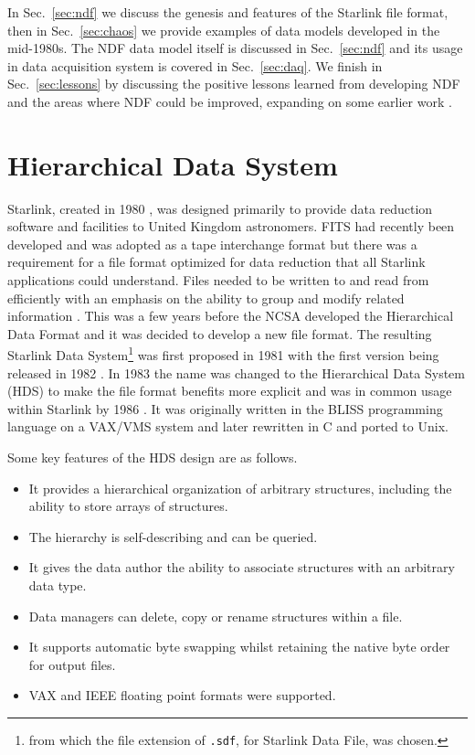 \documentclass[final,authoryear,5p,times,twocolumn]{elsarticle}
\begin{document}
In Sec.\ \ref{sec:ndf} we discuss the genesis and features of the Starlink
file format, then in Sec.\ \ref{sec:chaos} we provide examples of data
models developed in the mid-1980s. The NDF data model itself is
discussed in Sec.\ \ref{sec:ndf} and its usage in data acquisition
system is covered in Sec.\ \ref{sec:daq}. We finish in Sec.\
\ref{sec:lessons} by discussing the positive lessons learned from
developing NDF and the areas where NDF could be improved, expanding on
some earlier work \citep{P91_adassxxiii}.

\section{Hierarchical Data System}
\label{sec:hds}

Starlink, created in 1980
\citep{1980IrAJ...14..197E,1982MmSAI..53...55T}, was designed
primarily to provide data reduction software and facilities to United
Kingdom astronomers. FITS
\citep{1979ipia.coll..445W,1981A&AS...44..363W} had recently been
developed and was adopted as a tape interchange format but there was a
requirement for a file format optimized for data reduction that all
Starlink applications could understand. Files
needed to be written to and read from efficiently with an emphasis on the
ability to group and modify related information
\citep{1981STARENT4}. This was a few years before the NCSA developed
the Hierarchical Data Format \citep{HDF1,Folk2010} and it was decided
to develop a new file format. The resulting Starlink Data
System\footnote{from which the file extension of \texttt{.sdf}, for
  Starlink Data File, was chosen.} was first proposed in 1981 with the
first version being released in 1982 \citep[see
e.g.][]{1982QJRAS..23..485D,1991STARB...8....2L}. In 1983 the name was
changed to the Hierarchical Data System (HDS) to make the file format
benefits more explicit and was in common usage within Starlink by 1986
\citep{1986BICDS..30...13L}. It was originally written in the BLISS
programming language on a VAX/VMS system and later rewritten in C and
ported to Unix.

Some key features of the HDS design are as follows.
\begin{itemize}
\item It provides a hierarchical organization of arbitrary structures, including the
  ability to store arrays of structures.
\item The hierarchy is self-describing and can be queried.
\item It gives the data author the ability to associate structures with an arbitrary data type.
\item Data managers can delete, copy or rename structures within a file.
\item It supports automatic byte swapping whilst retaining the native byte order
  for output files.
\item VAX and IEEE floating point formats were supported.
\end{itemize}
\end{document}

